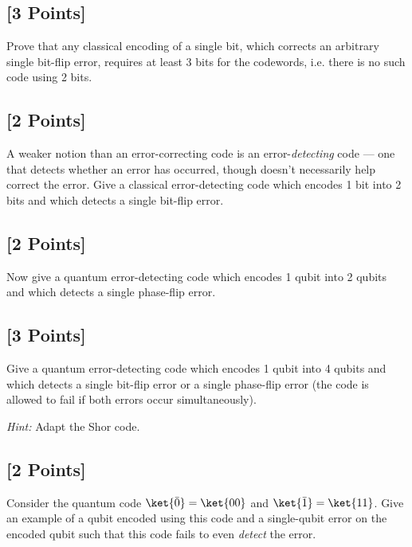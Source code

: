 \documentclass[11pt]{article}
\begin{document}
\subsection{[3 Points]}  Prove that any classical encoding of a single bit, which corrects
an arbitrary single bit-flip error, requires at least 3 bits for the
codewords,  i.e. there is no such code using 2 bits.


\subsection{[2 Points]} A weaker notion than an error-correcting code is an
error-\textit{detecting} code --- one that detects whether an error has
occurred, though doesn't necessarily help correct the error.  Give a
classical error-detecting code which encodes 1 bit into 2 bits and
which detects a single bit-flip error.


\subsection{[2 Points]} Now give a quantum error-detecting code which encodes 1 qubit
into 2 qubits and which detects a single phase-flip error.


\subsection{[3 Points]} Give a quantum error-detecting code which encodes 1 qubit into
4 qubits and which detects a single bit-flip error or a single
phase-flip error (the code is allowed to fail if both errors occur simultaneously). 

\noindent \textit{Hint:} Adapt the Shor code.

\subsection{[2 Points]} Consider the quantum code  $\ket{\bar 0} = \ket{00}$ and $\ket{\bar 1} = \ket{11}$.  Give an
example of a qubit encoded using this code and a single-qubit
error on the encoded qubit such that this code fails to even \textit{detect} the error.
\end{document}
